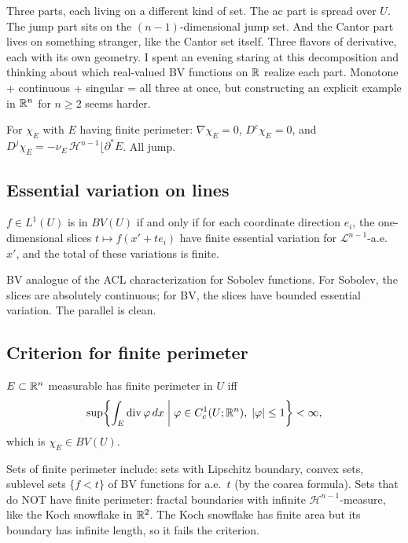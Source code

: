 Three parts, each living on a different kind of set. The ac part is spread over $U$. The jump part sits on the $(n-1)$-dimensional jump set. And the Cantor part lives on something stranger, like the Cantor set itself. Three flavors of derivative, each with its own geometry. I spent an evening staring at this decomposition and thinking about which real-valued BV functions on $\mathbb{R}$ realize each part. Monotone + continuous + singular = all three at once, but constructing an explicit example in $\mathbb{R}^n$ for $n \ge 2$ seems harder.

For $\chi_E$ with $E$ having finite perimeter: $\nabla\chi_E = 0$, $D^c\chi_E = 0$, and $D^j\chi_E = -\nu_E \,\mathcal{H}^{n-1}\lfloor\partial^*E$. All jump.

\subsection{Essential variation on lines}\label{subsec:essential-variation}

\begin{theorem}\label{thm:sections-bv}
$f \in L^1(U)$ is in $BV(U)$ if and only if for each coordinate direction $e_i$, the one-dimensional slices $t \mapsto f(x' + te_i)$ have finite essential variation for $\mathcal{L}^{n-1}$-a.e.\ $x'$, and the total of these variations is finite.
\end{theorem}

BV analogue of the ACL characterization for Sobolev functions. For Sobolev, the slices are absolutely continuous; for BV, the slices have bounded essential variation. The parallel is clean.

\subsection{Criterion for finite perimeter}\label{subsec:criterion}

\begin{theorem}[Criterion]\label{thm:criterion-perimeter}
$E \subset \mathbb{R}^n$ measurable has finite perimeter in $U$ iff
\[
  \sup\!\left\{ \int_E \operatorname{div}\varphi\, dx \;\bigg|\; \varphi \in C_c^1(U;\mathbb{R}^n),\; |\varphi| \le 1\right\} < \infty,
\]
which is $\chi_E \in BV(U)$.
\end{theorem}

Sets of finite perimeter include: sets with Lipschitz boundary, convex sets, sublevel sets $\{f < t\}$ of BV functions for a.e.\ $t$ (by the coarea formula). Sets that do NOT have finite perimeter: fractal boundaries with infinite $\mathcal{H}^{n-1}$-measure, like the Koch snowflake in $\mathbb{R}^2$. The Koch snowflake has finite area but its boundary has infinite length, so it fails the criterion.

